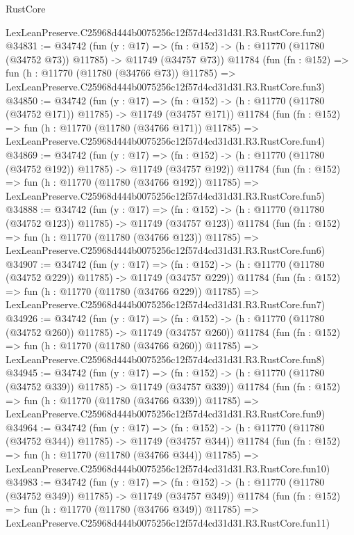 \begin{lexlean}{RustCore}
\begin{coremodule}
    LexLeanPreserve.C25968d444b0075256c12f57d4cd31d31.R3.RustCore.fun2)
@34831 := @34742
    (fun (y : @17) =>
    (fn : @152) -> (h : @11770 (@11780 (@34752 @73)) @11785) -> @11749 (@34757 @73))
    @11784
    (fun (fn : @152) =>
    fun (h : @11770 (@11780 (@34766 @73)) @11785) =>
    LexLeanPreserve.C25968d444b0075256c12f57d4cd31d31.R3.RustCore.fun3)
@34850 := @34742
    (fun (y : @17) =>
    (fn : @152) -> (h : @11770 (@11780 (@34752 @171)) @11785) -> @11749 (@34757 @171))
    @11784
    (fun (fn : @152) =>
    fun (h : @11770 (@11780 (@34766 @171)) @11785) =>
    LexLeanPreserve.C25968d444b0075256c12f57d4cd31d31.R3.RustCore.fun4)
@34869 := @34742
    (fun (y : @17) =>
    (fn : @152) -> (h : @11770 (@11780 (@34752 @192)) @11785) -> @11749 (@34757 @192))
    @11784
    (fun (fn : @152) =>
    fun (h : @11770 (@11780 (@34766 @192)) @11785) =>
    LexLeanPreserve.C25968d444b0075256c12f57d4cd31d31.R3.RustCore.fun5)
@34888 := @34742
    (fun (y : @17) =>
    (fn : @152) -> (h : @11770 (@11780 (@34752 @123)) @11785) -> @11749 (@34757 @123))
    @11784
    (fun (fn : @152) =>
    fun (h : @11770 (@11780 (@34766 @123)) @11785) =>
    LexLeanPreserve.C25968d444b0075256c12f57d4cd31d31.R3.RustCore.fun6)
@34907 := @34742
    (fun (y : @17) =>
    (fn : @152) -> (h : @11770 (@11780 (@34752 @229)) @11785) -> @11749 (@34757 @229))
    @11784
    (fun (fn : @152) =>
    fun (h : @11770 (@11780 (@34766 @229)) @11785) =>
    LexLeanPreserve.C25968d444b0075256c12f57d4cd31d31.R3.RustCore.fun7)
@34926 := @34742
    (fun (y : @17) =>
    (fn : @152) -> (h : @11770 (@11780 (@34752 @260)) @11785) -> @11749 (@34757 @260))
    @11784
    (fun (fn : @152) =>
    fun (h : @11770 (@11780 (@34766 @260)) @11785) =>
    LexLeanPreserve.C25968d444b0075256c12f57d4cd31d31.R3.RustCore.fun8)
@34945 := @34742
    (fun (y : @17) =>
    (fn : @152) -> (h : @11770 (@11780 (@34752 @339)) @11785) -> @11749 (@34757 @339))
    @11784
    (fun (fn : @152) =>
    fun (h : @11770 (@11780 (@34766 @339)) @11785) =>
    LexLeanPreserve.C25968d444b0075256c12f57d4cd31d31.R3.RustCore.fun9)
@34964 := @34742
    (fun (y : @17) =>
    (fn : @152) -> (h : @11770 (@11780 (@34752 @344)) @11785) -> @11749 (@34757 @344))
    @11784
    (fun (fn : @152) =>
    fun (h : @11770 (@11780 (@34766 @344)) @11785) =>
    LexLeanPreserve.C25968d444b0075256c12f57d4cd31d31.R3.RustCore.fun10)
@34983 := @34742
    (fun (y : @17) =>
    (fn : @152) -> (h : @11770 (@11780 (@34752 @349)) @11785) -> @11749 (@34757 @349))
    @11784
    (fun (fn : @152) =>
    fun (h : @11770 (@11780 (@34766 @349)) @11785) =>
    LexLeanPreserve.C25968d444b0075256c12f57d4cd31d31.R3.RustCore.fun11)

\end{coremodule}
\end{lexlean}
